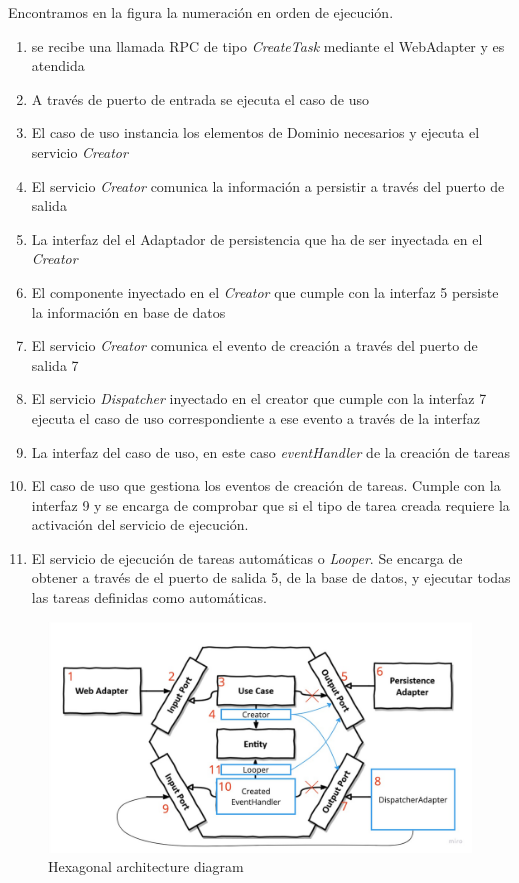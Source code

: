 Encontramos en la figura la numeración en orden de ejecución.
\begin{enumerate}
    \item se recibe una llamada RPC de tipo \textit{CreateTask} mediante el WebAdapter y es atendida
    \item A través de puerto de entrada se ejecuta el caso de uso
    \item El caso de uso instancia los elementos de Dominio necesarios y ejecuta el servicio \textit{Creator}
    \item El servicio \textit{Creator} comunica la información a persistir a través del puerto de salida
    \item La interfaz del el Adaptador de persistencia que ha de ser inyectada en el \textit{Creator}
    \item El componente inyectado en el \textit{Creator} que cumple con la interfaz 5 persiste la información en base de datos
    \item El servicio \textit{Creator} comunica el evento de creación a través del puerto de salida 7
    \item El servicio \textit{Dispatcher} inyectado en el creator que cumple con la interfaz 7 ejecuta el caso de uso correspondiente a ese evento a través de la interfaz
    \item La interfaz del caso de uso, en este caso \textit{eventHandler} de la creación de tareas
    \item El caso de uso que gestiona los eventos de creación de tareas.
    Cumple con la interfaz 9 y se encarga de comprobar que si el tipo de tarea creada requiere la activación del servicio de ejecución.
    \item El servicio de ejecución de tareas automáticas o \textit{Looper}.
    Se encarga de obtener a través de el puerto de salida 5, de la base de datos, y ejecutar todas las tareas definidas como automáticas.
\end{enumerate}

\begin{figure}[H]
    \centering
    \includegraphics[height=0.3\textheight]{./part/Ejecucion/Seguimiento/CreateTaskUseCase/img/CreateTaskHexagonalDiagram}
    \caption{Hexagonal architecture diagram}\label{fig:CreateTaskHexagonalDiagram}
\end{figure}

